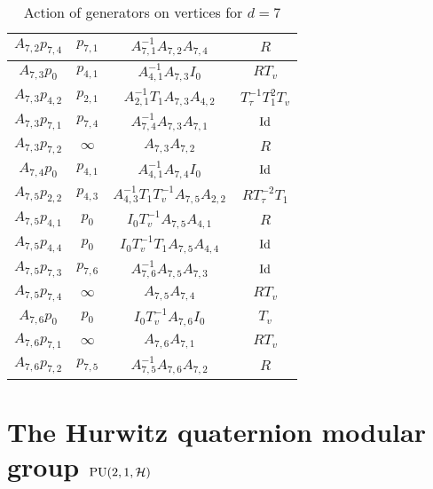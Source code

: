 \documentclass{article}[12pt]
\begin{document}
\begin{table}
\begin{center}
{\begin{tabular}{|c|c|c|c|}
$A_{7,2}p_{7,4}$ & $p_{7,1}$ & $A_{7,1}^{-1}A_{7,2}A_{7,4}$ & $R$\\
\hline

$A_{7,3}p_0$ & $p_{4,1}$ & $A_{4,1}^{-1}A_{7,3}I_0$ & $RT_v$\\
\hline

$A_{7,3}p_{4,2}$ & $p_{2,1}$ & $A_{2,1}^{-1}T_1A_{7,3}A_{4,2}$ & $T_\tau ^{-1}T_1^2T_v$\\
\hline

$A_{7,3}p_{7,1}$ & $p_{7,4}$ & $A_{7,4}^{-1}A_{7,3}A_{7,1}$ & ${\rm Id}$\\
\hline

$A_{7,3}p_{7,2}$ & $\infty$ & $A_{7,3}A_{7,2}$ & $R$\\
\hline

$A_{7,4}p_0$ & $p_{4,1}$ & $A_{4,1}^{-1}A_{7,4}I_0$ & ${\rm Id}$\\
\hline

$A_{7,5}p_{2,2}$ & $p_{4,3}$ & $A_{4,3}^{-1}T_1T_v^{-1}A_{7,5}A_{2,2}$ & $RT_\tau ^{-2}T_1$\\
\hline

$A_{7,5}p_{4,1}$ & $p_0$ & $I_0T_v^{-1}A_{7,5}A_{4,1}$ & $R$\\
\hline

$A_{7,5} p_{4,4}$ & $p_0$ & $I_0T_v^{-1}T_1 A_{7,5}A_{4,4}$ & ${\rm Id}$\\
\hline

$A_{7,5}p_{7,3}$ & $p_{7,6}$ & $A_{7,6}^{-1}A_{7,5}A_{7,3}$ & ${\rm Id}$\\
\hline

$A_{7,5}p_{7,4}$ & $\infty$ & $A_{7,5}A_{7,4}$ & $RT_v$\\
\hline

$A_{7,6}p_0$ & $p_0$ & $I_0T_v^{-1}A_{7,6}I_0$ & $T_v$\\
\hline

$A_{7,6}p_{7,1}$ & $\infty$ & $A_{7,6}A_{7,1}$ & $RT_v$\\
\hline

$A_{7,6}p_{7,2}$ & $p_{7,5}$ & $A_{7,5}^{-1}A_{7,6}A_{7,2}$ & $R$\\
\hline

  
\end{tabular}
}
\end{center}
\caption{Action of generators on vertices for $d=7$}
\end{table}




\section{The Hurwitz quaternion modular group ${\rm PU}(2,1,\mathcal{H})$}
\end{document}
